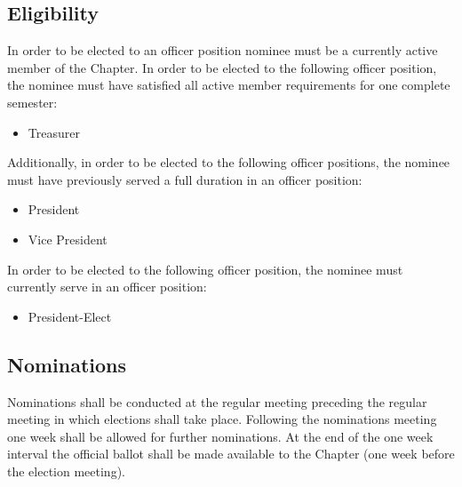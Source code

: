 \documentclass[10pt, oneside]{article}
\begin{document}
\subsection{Eligibility}
In order to be elected to an officer position nominee must be a currently active member of the Chapter. In order to be elected to the following officer position, the nominee must have satisfied all active member requirements for one complete semester:
\begin{itemize}
\item Treasurer
\end{itemize}
Additionally, in order to be elected to the following officer positions, the nominee
must have previously served a full duration in an officer position:
\begin{itemize}
\item President
\item Vice President
\end{itemize}
In order to be elected to the following officer position, the nominee must currently serve in an officer position:
\begin{itemize}
\item President-Elect
\end{itemize}
\subsection{Nominations}
Nominations shall be conducted at the regular meeting preceding the regular meeting in which elections shall take place. Following the nominations meeting one week shall be allowed for further nominations. At the end of the one week interval the official ballot shall be made available to the Chapter (one week before the election meeting).
\end{document}

